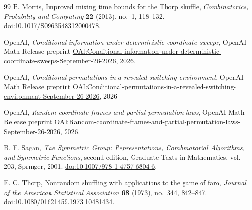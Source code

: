 \begin{thebibliography}{99}
B. Morris,
Improved mixing time bounds for the Thorp shuffle,
\emph{Combinatorics, Probability and Computing}
\textbf{22} (2013), no.~1, 118--132.
\href{https://doi.org/10.1017/S0963548312000478}{doi:10.1017/S0963548312000478}.

OpenAI,
\emph{Conditional information under deterministic coordinate sweeps},
OpenAI Math Release preprint
\href{https://github.com/openai/math/blob/main/preprints/Conditional-information-under-deterministic-coordinate-sweeps-September-26-2026/main.pdf}{OAI:Conditional-information-under-deterministic-coordinate-sweeps-September-26-2026},
2026.

OpenAI,
\emph{Conditional permutations in a revealed switching environment},
OpenAI Math Release preprint
\href{https://github.com/openai/math/blob/main/preprints/Conditional-permutations-in-a-revealed-switching-environment-September-26-2026/paper.pdf}{OAI:Conditional-permutations-in-a-revealed-switching-environment-September-26-2026},
2026.

OpenAI,
\emph{Random coordinate frames and partial permutation laws},
OpenAI Math Release preprint
\href{https://github.com/openai/math/blob/main/preprints/Random-coordinate-frames-and-partial-permutation-laws-September-26-2026/main.pdf}{OAI:Random-coordinate-frames-and-partial-permutation-laws-September-26-2026},
2026.

B. E. Sagan, \emph{The Symmetric Group: Representations, Combinatorial Algorithms, and Symmetric Functions}, second edition,
Graduate Texts in Mathematics, vol. 203, Springer, 2001.
\href{https://doi.org/10.1007/978-1-4757-6804-6}{doi:10.1007/978-1-4757-6804-6}.

E. O. Thorp,
Nonrandom shuffling with applications to the game of faro,
\emph{Journal of the American Statistical Association}
\textbf{68} (1973), no.~344, 842--847.
\href{https://doi.org/10.1080/01621459.1973.10481434}{doi:10.1080/01621459.1973.10481434}.

\end{thebibliography}
